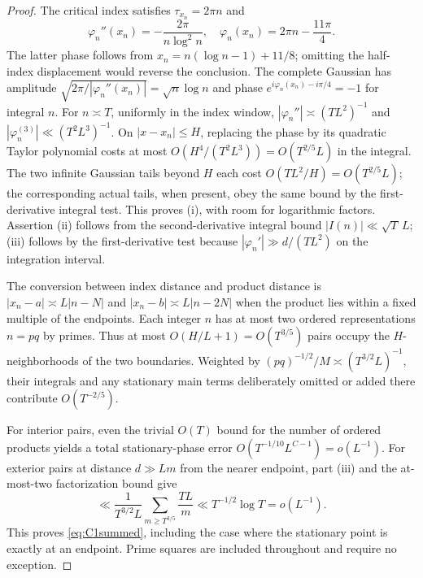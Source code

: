 \documentclass[11pt,reqno]{amsart}
\numberwithin{equation}{section}
\begin{document}
\begin{proof}
The critical index satisfies $\tau_{x_n}=2\pi n$ and
\[
\varphi_n''(x_n)=-\frac{2\pi}{n\log^2 n},\quad
\varphi_n(x_n)=2\pi n-\frac{11\pi}4.
\]
The latter phase follows from
$x_n=n(\log n-1)+11/8$; omitting the half-index displacement
would reverse the conclusion. The complete Gaussian has amplitude
$\sqrt{2\pi/|\varphi_n''(x_n)|}=\sqrt n\log n$ and phase
$e^{i\varphi_n(x_n)-i\pi/4}=-1$ for integral $n$.
For $n\asymp T$, uniformly in the index window,
$|\varphi_n''|\asymp(TL^2)^{-1}$ and
$|\varphi_n^{(3)}|\ll(T^2L^3)^{-1}$.
On $|x-x_n|\le H$, replacing the phase by its quadratic Taylor
polynomial costs at most
$O(H^4/(T^2L^3))=O(T^{2/5}L)$ in the integral.
The two infinite Gaussian tails beyond $H$ each cost
$O(TL^2/H)=O(T^{2/5}L)$; the corresponding actual tails, when
present, obey the same bound by the first-derivative integral
test. This proves (i), with room for logarithmic factors.
Assertion (ii) follows from the second-derivative integral bound
$|I(n)|\ll\sqrt T\,L$; (iii) follows by the first-derivative
test because $|\varphi_n'|\gg d/(TL^2)$ on the integration interval.

The conversion between index distance and product distance is
$|x_n-a|\asymp L|n-N|$ and
$|x_n-b|\asymp L|n-2N|$ when the product lies within a fixed
multiple of the endpoints. Each integer $n$ has at most two
ordered representations $n=pq$ by primes. Thus at most $O(H/L+1)
=O(T^{3/5})$ pairs occupy the $H$-neighborhoods of the two
boundaries. Weighted by $(pq)^{-1/2}/M\asymp(T^{3/2}L)^{-1}$,
their integrals and any stationary main terms deliberately
omitted or added there contribute $O(T^{-2/5})$.

For interior pairs, even the trivial $O(T)$ bound for the number of
ordered products yields a total stationary-phase error
$O(T^{-1/10}L^{C-1})=o(L^{-1})$.
For exterior pairs at distance $d\gg Lm$ from the nearer endpoint,
part (iii) and the at-most-two factorization bound give
\[
\ll\frac1{T^{3/2}L}\sum_{m\ge T^{3/5}}\frac{TL}{m}
\ll T^{-1/2}\log T=o(L^{-1}).
\]
This proves \eqref{eq:C1summed}, including the case where the
stationary point is exactly at an endpoint. Prime squares are
included throughout and require no exception.
\end{proof}
\end{document}
